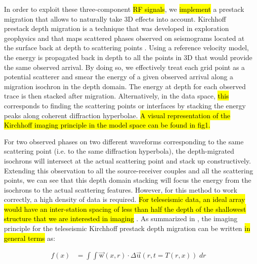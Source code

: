 \documentclass[10pt,a4paper]{article}
\begin{document}
In order to exploit these three-component \hl{RF signals}, we \hl{implement} a prestack migration that allows to naturally take 3D effects into account. %
Kirchhoff prestack depth migration is a technique that was developed in exploration geophysics and that maps scattered phases observed on seismograms located at the surface back at depth to scattering points \citep{ylma_book_01}.
Using a reference velocity model, the energy is propagated back in depth to all the points in 3D that would provide the same observed arrival.
By doing so, we effectively treat each grid point as a potential scatterer and smear the energy of a given observed arrival along a migration isochron in the depth domain.
The energy at depth for each observed trace is then stacked after migration.
Alternatively, in the data space, \hl{this} corresponds to finding the scattering points or interfaces by stacking the energy peaks along coherent diffraction hyperbolae.
\hl{A visual representation of the Kirchhoff imaging principle in the model space can be found in fig1.}

For two observed phases on two different waveforms corresponding to the same scattering point (i.e. to the same diffraction hyperbola), the depth-migrated isochrons will intersect at the actual scattering point and stack up constructively.
Extending this observation to all the source-receiver couples and all the scattering points, we can see that this depth domain stacking will focus the energy from the isochrons to the actual scattering features.
However, for this method to work correctly, a high density of data is required.
\hl{For teleseismic data, an ideal array would have an inter-station spacing of less than half the depth of the shallowest structure that we are interested in imaging} \citep{rond_agu_05}.
As summarized in \citet{rond_sgeo_09}, the imaging principle for the teleseismic Kirchhoff prestack depth migration can be written \hl{in general terms} as:

\begin{align}
  f(x) &= \int\!\!\!\!\int \vec{\text{w}}(x,r) \cdot \Delta\vec{\text{u}}(r,t=T(r,x)) \; dr
  \label{gen}
\end{align}
\vspace{1mm}
\end{document}
